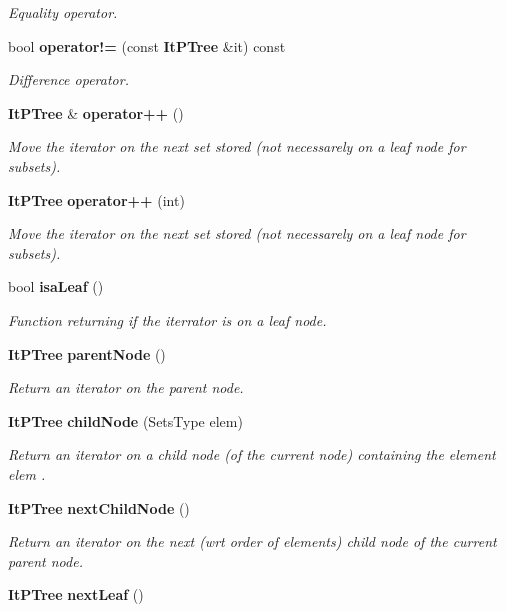 \begin{CompactItemize}
\begin{CompactList}\small\item\em Equality operator. \item\end{CompactList}\item 
bool {\bf operator!=} (const {\bf It\-PTree} \&it) const \label{class_it_p_tree_6cc6bc3ccd5755ef7a91a8b3ecd73ee5}

\begin{CompactList}\small\item\em Difference operator. \item\end{CompactList}\item 
{\bf It\-PTree} \& {\bf operator++} ()\label{class_it_p_tree_0e42ede29d18334dcedbb0656b8372a7}

\begin{CompactList}\small\item\em Move the iterator on the next set stored (not necessarely on a leaf node for subsets). \item\end{CompactList}\item 
{\bf It\-PTree} {\bf operator++} (int)\label{class_it_p_tree_92399b9aead4b4e16fc1996fa52d2e55}

\begin{CompactList}\small\item\em Move the iterator on the next set stored (not necessarely on a leaf node for subsets). \item\end{CompactList}\item 
bool {\bf isa\-Leaf} ()
\begin{CompactList}\small\item\em Function returning if the iterrator is on a leaf node. \item\end{CompactList}\item 
{\bf It\-PTree} {\bf parent\-Node} ()
\begin{CompactList}\small\item\em Return an iterator on the parent node. \item\end{CompactList}\item 
{\bf It\-PTree} {\bf child\-Node} (Sets\-Type elem)
\begin{CompactList}\small\item\em Return an iterator on a child node (of the current node) containing the element elem . \item\end{CompactList}\item 
{\bf It\-PTree} {\bf next\-Child\-Node} ()
\begin{CompactList}\small\item\em Return an iterator on the next (wrt order of elements) child node of the current parent node. \item\end{CompactList}\item 
{\bf It\-PTree} {\bf next\-Leaf} ()\label{class_it_p_tree_95240af4b79e469ec380c1b54fe817dc}


\end{CompactItemize}
